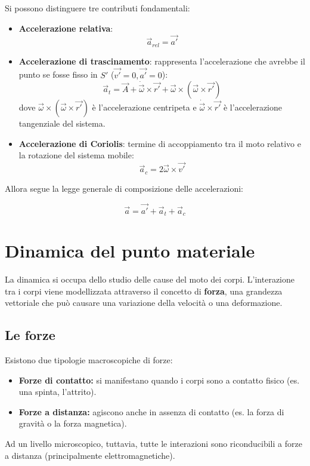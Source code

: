 \documentclass[11pt, a4paper, openright]{book}
\theoremstyle{plain}
\theoremstyle{definition}
\begin{document}
Si possono distinguere tre contributi fondamentali:
\begin{itemize}
    \item \textbf{Accelerazione relativa}:
    \[\vec{a}_{rel} = \vec{a'}\]
    
    \item \textbf{Accelerazione di trascinamento}: rappresenta l'accelerazione che avrebbe il punto se fosse fisso in $S'$ ($\vec{v'} = 0, \vec{a'} = 0$):
    \[\vec{a}_t = \vec{A} + \dot{\vec{\omega}} \times \vec{r'} + \vec{\omega} \times (\vec{\omega} \times \vec{r'})\]
    dove $\vec{\omega} \times (\vec{\omega} \times \vec{r'})$ è l'accelerazione centripeta e $\dot{\vec{\omega}} \times \vec{r'}$ è l'accelerazione tangenziale del sistema.
    
    \item \textbf{Accelerazione di Coriolis}: termine di accoppiamento tra il moto relativo e la rotazione del sistema mobile:
    \[\vec{a}_c = 2\vec{\omega} \times \vec{v'}\]
\end{itemize}

Allora segue la legge generale di composizione delle accelerazioni:

\[\vec{a} = \vec{a'} + \vec{a}_t + \vec{a}_c\]

\chapter{Dinamica del punto materiale}
La dinamica si occupa dello studio delle cause del moto dei corpi. L'interazione tra i corpi viene modellizzata attraverso il concetto di \textbf{forza}, una grandezza vettoriale che può causare una variazione della velocità o una deformazione.

\section{Le forze}
Esistono due tipologie macroscopiche di forze:
\begin{itemize}
    \item \textbf{Forze di contatto:} si manifestano quando i corpi sono a contatto fisico (es. una spinta, l'attrito).
    \item \textbf{Forze a distanza:} agiscono anche in assenza di contatto (es. la forza di gravità o la forza magnetica).
\end{itemize}
Ad un livello microscopico, tuttavia, tutte le interazioni sono riconducibili a forze a distanza (principalmente elettromagnetiche).
\end{document}

